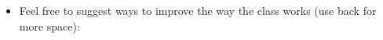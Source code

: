 \documentclass[handout]{mcs}
\begin{document}
\begin{itemize}
\iffalse

\item Would you like the staff (Meyer/TA/LA) to present solutions to
  selected problems in class after your team has finished working on
  them?

\begin{center}
Never \hspace{0.7in} Rarely \hspace{0.7in} Sometimes \hspace{0.7in}
Regularly \hspace{0.7in} Always
\end{center}
\fi

\item Feel free to suggest ways to improve the way the class works
  (use back for more space):
\vspace{1in}

\end{itemize}
\end{document}
